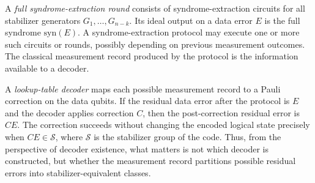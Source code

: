 \documentclass[acmsmall,screen,review,anonymous,nonacm]{acmart}
\begin{document}
A \emph{full syndrome-extraction round} consists of syndrome-extraction circuits for all stabilizer generators $G_1,\ldots,G_{n-k}$. Its ideal output on a data error $E$ is the full syndrome $\mathrm{syn}(E)$. A syndrome-extraction protocol may execute one or more such circuits or rounds, possibly depending on previous measurement outcomes. The classical measurement record produced by the protocol is the information available to a decoder.

A \emph{lookup-table decoder} maps each possible measurement record to a Pauli correction on the data qubits. If the residual data error after the protocol is $E$ and the decoder applies correction $C$, then the post-correction residual error is $CE$. The correction succeeds without changing the encoded logical state precisely when $CE\in\mathcal{S}$, where $\mathcal{S}$ is the stabilizer group of the code. Thus, from the perspective of decoder existence, what matters is not which decoder is constructed, but whether the measurement record partitions possible residual errors into stabilizer-equivalent classes.
\end{document}
